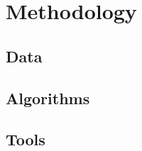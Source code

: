 \chapter{Methodology}
\label{chapterlabel4}

\section{Data}

\blindtext

\section{Algorithms}

\blindtext

\section{Tools}

\blindtext